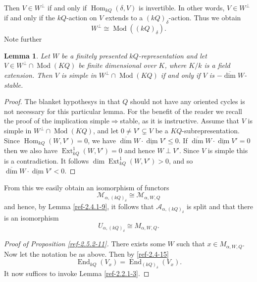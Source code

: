 \documentclass{amsart}
\numberwithin{equation}{section}
\let\cal\mathcal
\newtheorem{lemmas}{Lemma}[subsection]
\theoremstyle{definition}
\theoremstyle{remark}
\begin{document}
Then $V\in W^\perp$ if and
only if ${\operatorname {Hom}}_{kQ}(\delta,V)$ is invertible. In other words, $V\in W^\perp$ if and only if the $kQ$-action on $V$ 
extends to a $(kQ)_{\delta}$-action. Thus we obtain
\begin{equation}
\label{ref-2.4-15}
W^\perp\cong {\operatorname{Mod}}((kQ)_\delta).
\end{equation}
Note further
\begin{lemmas} \cite[Lemma 3.1]{ALeB} Let $W$ be a finitely presented $kQ$-representation and let $V\in W^\perp\cap {\operatorname{Mod}}(KQ)$ be finite dimensional over $K$, where $K/k$ is a field extension. 
Then $V$ is simple in $W^\perp\cap {\operatorname{Mod}}(KQ)$ if and only if $V$ is $-{\operatorname{\overline{\dim}}} W$-stable.
\end{lemmas}
\begin{proof} The blanket hypothesys in \cite{ALeB} that $Q$ should not have any oriented cycles is not necessary for this particular lemma. For the benefit of the reader we recall the proof of the implication
simple$\Rightarrow$stable, as it is instructive. Assume that $V$ is simple in $W^\perp\cap {\operatorname{Mod}}(KQ)$,
and let $0\neq V'\subsetneq V$ be a $KQ$-subrepresentation. Since ${\operatorname {Hom}}_{kQ}(W,V')=0$, we have
${\operatorname{\overline{\dim}}} W\cdot {\operatorname{\underline{\dim}}} V'\le 0$. If ${\operatorname{\overline{\dim}}} W\cdot {\operatorname{\underline{\dim}}} V'=0$ then we also have ${\operatorname {Ext}}^1_{kQ}(W,V')=0$
and hence $W\perp V'$. Since $V$ is simple this is a contradiction. It follows
$\dim {\operatorname {Ext}}^1_{kQ}(W,V')>0$, and so ${\operatorname{\overline{\dim}}} W\cdot {\operatorname{\underline{\dim}}} V'<0$.
\end{proof}
From this we easily obtain an isomorphism of functors
\[
{{\cal M}}_{\alpha,(kQ)_\delta}\cong {{\cal M}}_{\alpha,W,Q}
\]
and hence, by Lemma \ref{ref-2.4.1-9}, it follows that ${{\cal A}}_{\alpha,(kQ)_\delta}$ is split and that there is an isomorphism
\[
U_{\alpha,(kQ)_\delta}\cong M_{\alpha,W,Q}.
\]
\begin{proof}[Proof of Proposition \ref{ref-2.5.2-11}] There exists some $W$ such that
$x\in M_{\alpha,W,Q}$. Now let the notation be as above. Then by \eqref{ref-2.4-15}
\[
{\operatorname {End}}_{kQ}(V_x)={\operatorname {End}}_{(kQ)_\delta}(V_x).
\]
It now suffices to invoke Lemma \ref{ref-2.2.1-3}.
\end{proof}
\end{document}
